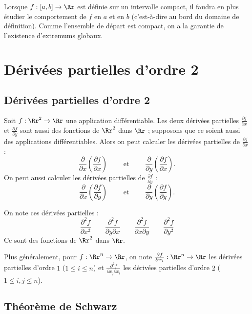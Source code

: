 Lorsque $f : [a,b] \to \Rr$ est définie sur un intervalle compact, il faudra en plus étudier le comportement de $f$ en $a$ et en $b$ (c'est-à-dire au bord du domaine de définition). Comme l'ensemble de départ est compact, on a la garantie de l'existence d'extremums globaux.
    

\section{Dérivées partielles d'ordre 2}

\subsection{Dérivées partielles d'ordre 2}

Soit $f : \Rr^2 \to \Rr$ une application différentiable.
Les deux dérivées partielles $\frac{\partial f}{\partial x}$
et $\frac{\partial f}{\partial y}$ sont aussi des fonctions de $\Rr^2$ dans $\Rr$ ; 
supposons que ce soient aussi des applications différentiables.
Alors on peut calculer les dérivées partielles de $\frac{\partial f}{\partial x}$ :
$$\frac{\partial}{\partial x}\left(\frac{\partial f}{\partial x}\right)
\qquad \text{ et } \qquad 
\frac{\partial}{\partial y}\left(\frac{\partial f}{\partial x}\right).$$
On peut aussi calculer les dérivées partielles de $\frac{\partial f}{\partial y}$ :
$$\frac{\partial}{\partial x}\left(\frac{\partial f}{\partial y}\right)
\qquad \text{ et } \qquad 
\frac{\partial}{\partial y}\left(\frac{\partial f}{\partial y}\right).$$

On note ces dérivées partielles :
$$\frac{\partial ^2 f}{\partial x^2}
\qquad
\frac{\partial ^2 f}{\partial y\partial x}
\qquad
\frac{\partial ^2 f}{\partial x\partial y}
\qquad
\frac{\partial ^2 f}{\partial y^2}
$$
Ce sont des fonctions de $\Rr^2$ dans $\Rr$.


Plus généralement, pour $f : \Rr^n \to \Rr$, on note $\frac{\partial f}{\partial x_i} : \Rr^n \to \Rr$ les dérivées partielles d'ordre $1$ ($1 \le i \le n$)
et $\frac{\partial ^2f}{\partial x_j\partial x_i}$ les dérivées partielles d'ordre $2$ ($1 \le i,j \le n$).


\subsection{Théorème de Schwarz}


